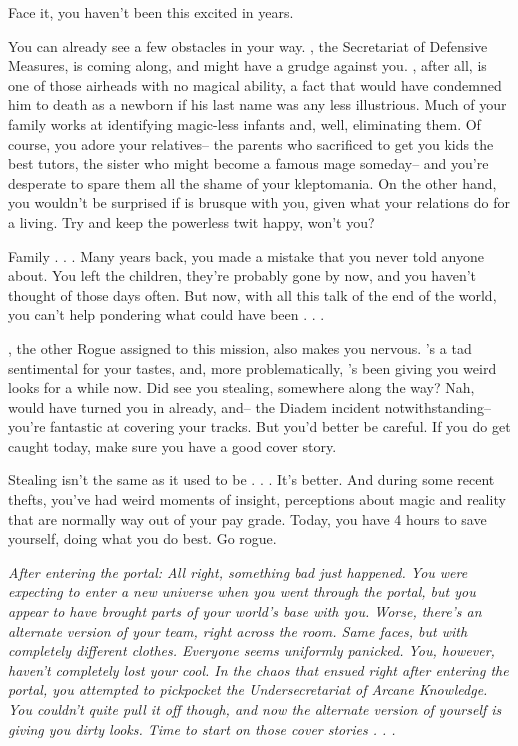 \documentclass[char]{guildcamp3}
\begin{document}
Face it, you haven't been this excited in years.

You can already see a few obstacles in your way. \cNobleOne{}, the Secretariat of Defensive Measures, is coming along, and \cNobleOne{\they} might have a grudge against you.  \cNobleOne{\they}, after all, is one of those airheads with no magical ability, a fact that would have condemned him to death as a newborn if his last name was any less illustrious. Much of your family works at identifying magic-less infants and, well, eliminating them. Of course, you adore your relatives-- the parents who sacrificed to get you kids the best tutors, the sister who might become a famous mage someday-- and you're desperate to spare them all the shame of your kleptomania. On the other hand, you wouldn't be surprised if \cNobleOne{} is brusque with you, given what your relations do for a living. Try and keep the powerless twit happy, won't you? 

Family . . . Many years back, you made a mistake that you never told anyone about. You left the children, they're probably gone by now, and you haven't thought of those days often. But now, with all this talk of the end of the world, you can't help pondering what could have been . . .

\cRogueOne{}, the other Rogue assigned to this mission, also makes you nervous. \cRogueOne{\they}'s a tad sentimental for your tastes, and, more problematically, \cRogueOne{\they}'s been giving you weird looks for a while now. Did \cRogueOne{\they} see you stealing, somewhere along the way? Nah, \cRogueOne{\they} would have turned you in already, and-- the Diadem incident notwithstanding-- you're fantastic at covering your tracks. But you'd better be careful. If you do get caught today, make sure you have a good cover story.

Stealing isn't the same as it used to be . . . It's better. And during some recent thefts, you've had weird moments of insight, perceptions about magic and reality that are normally way out of your pay grade.  Today, you have 4 hours to save yourself, doing what you do best. Go rogue.

\em{After entering the portal:}
All right, something bad just happened. You were expecting to enter a new universe when you went through the portal, but you appear to have brought parts of your world's base with you. Worse, there's an alternate version of your team, right across the room. Same faces, but with completely different clothes. Everyone seems uniformly panicked.
You, however, haven't completely lost your cool. In the chaos that ensued right after entering the portal, you attempted to pickpocket the Undersecretariat of Arcane Knowledge. You couldn't quite pull it off though, and now the alternate version of yourself is giving you dirty looks. Time to start on those cover stories . . .
\end{document}
